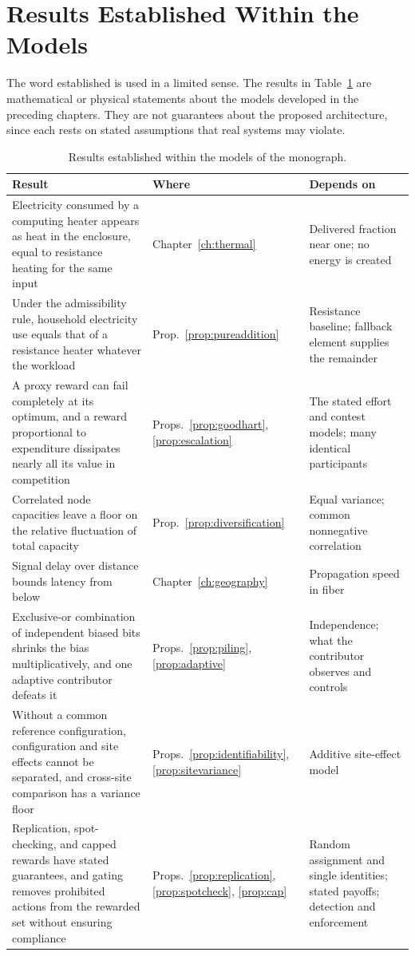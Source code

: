 \section{Results Established Within the Models}

The word established is used in a limited sense. The results in Table~\ref{tab:established} are mathematical or physical statements about the models developed in the preceding chapters. They are not guarantees about the proposed architecture, since each rests on stated assumptions that real systems may violate.

\begin{table}[ht]
\centering
\small
\begin{tabular}{>{\raggedright\arraybackslash}p{2.55in}>{\raggedright\arraybackslash}p{0.9in}>{\raggedright\arraybackslash}p{1.85in}}
\toprule
Result & Where & Depends on \\
\midrule
Electricity consumed by a computing heater appears as heat in the enclosure, equal to resistance heating for the same input & Chapter~\ref{ch:thermal} & Delivered fraction near one; no energy is created \\
Under the admissibility rule, household electricity use equals that of a resistance heater whatever the workload & Prop.~\ref{prop:pureaddition} & Resistance baseline; fallback element supplies the remainder \\
A proxy reward can fail completely at its optimum, and a reward proportional to expenditure dissipates nearly all its value in competition & Props.~\ref{prop:goodhart}, \ref{prop:escalation} & The stated effort and contest models; many identical participants \\
Correlated node capacities leave a floor on the relative fluctuation of total capacity & Prop.~\ref{prop:diversification} & Equal variance; common nonnegative correlation \\
Signal delay over distance bounds latency from below & Chapter~\ref{ch:geography} & Propagation speed in fiber \\
Exclusive-or combination of independent biased bits shrinks the bias multiplicatively, and one adaptive contributor defeats it & Props.~\ref{prop:piling}, \ref{prop:adaptive} & Independence; what the contributor observes and controls \\
Without a common reference configuration, configuration and site effects cannot be separated, and cross-site comparison has a variance floor & Props.~\ref{prop:identifiability}, \ref{prop:sitevariance} & Additive site-effect model \\
Replication, spot-checking, and capped rewards have stated guarantees, and gating removes prohibited actions from the rewarded set without ensuring compliance & Props.~\ref{prop:replication}, \ref{prop:spotcheck}, \ref{prop:cap} & Random assignment and single identities; stated payoffs; detection and enforcement \\
\bottomrule
\end{tabular}
\caption{Results established within the models of the monograph.}
\label{tab:established}
\end{table}

